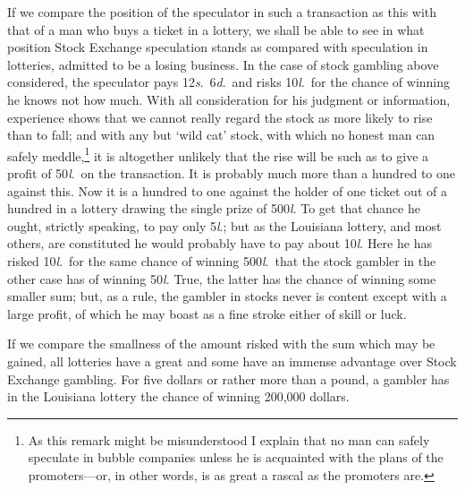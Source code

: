 \documentclass[letterpaper,12pt,oneside,openany]{memoir}
\begin{document}
If we compare the position of the speculator in such
a transaction as this with that of a man who buys a
ticket in a lottery, we shall be able to see in what position
Stock Exchange speculation stands as compared
with speculation in lotteries, admitted to be a losing
business. In the case of stock gambling above considered,
the speculator pays 12\textit{s}.\ 6\textit{d}.\ and risks 10\textit{l}.\ for
the chance of winning he knows not how much. With
all consideration for his judgment or information, experience
shows that we cannot really regard the stock as
more likely to rise than to fall; and with any but `wild
cat' stock, with which no honest man can safely
meddle,\footnote{As this remark might be misunderstood I explain that no man
can safely speculate in bubble companies unless he is acquainted
with the plans of the promoters---or, in other words, is as great a
rascal as the promoters are.}
it is altogether unlikely that the rise will be such as to
give a profit of 50\textit{l}.\ on the transaction. It is probably
much more than a hundred to one against this. Now
it is a hundred to one against the holder of one ticket
out of a hundred in a lottery drawing the single prize
of 500\textit{l}. To get that chance he ought, strictly speaking,
to pay only 5\textit{l}.; but as the Louisiana lottery, and
most others, are constituted he would probably have to
pay about 10\textit{l}. Here he has risked 10\textit{l}.\ for the same
chance of winning 500\textit{l}.\ that the stock gambler in the
other case has of winning 50\textit{l}. True, the latter has the
chance of winning some smaller sum; but, as a rule,
the gambler in stocks never is content except with a
large profit, of which he may boast as a fine stroke
either of skill or luck.

If we compare the smallness of the amount risked
with the sum which may be gained, all lotteries have a
great and some have an immense advantage over Stock
Exchange gambling. For five dollars or rather more
than a pound, a gambler has in the Louisiana lottery
the chance of winning 200,000 dollars.
\end{document}
